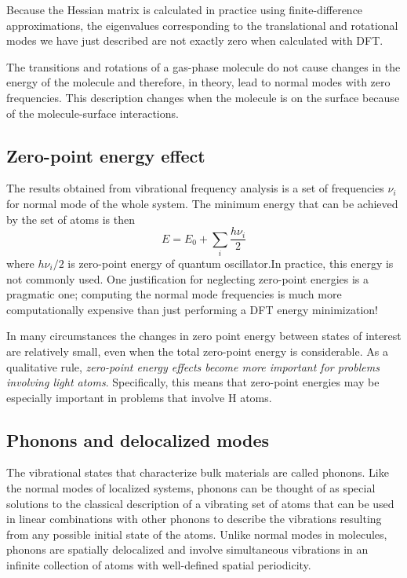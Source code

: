 \documentclass[12pt]{article}
\begin{document}
Because the Hessian matrix is calculated in practice using finite-difference approximations, the eigenvalues corresponding to the translational and rotational modes we have just described are not exactly zero when calculated with DFT.

The transitions and rotations of a gas-phase molecule do not cause changes in the energy of the molecule and therefore, in theory, lead to normal modes with zero frequencies. This description changes when the molecule is on the surface because of the molecule-surface interactions.

\subsection{Zero-point energy effect}
The results obtained from vibrational frequency analysis is a set of frequencies $\nu_i$ for normal mode of the whole system. The minimum energy that can be achieved by the set of atoms is then
\begin{equation}
    E = E_0 + \sum_i\frac{h\nu_i}{2}
\end{equation}
where $h\nu_i/2$ is zero-point energy of quantum oscillator.In practice, this energy is not commonly used. One justification for neglecting zero-point energies is a pragmatic one; computing the normal mode frequencies is much more computationally expensive than just performing a DFT energy minimization!

In many circumstances the changes in zero point energy between states of interest are relatively small, even when the total zero-point energy is considerable. As a qualitative rule, \emph{zero-point energy effects become more important for problems involving light atoms}. Specifically, this means that zero-point energies may be especially important in problems that involve H atoms.

\subsection{Phonons and delocalized modes}
The vibrational states that characterize bulk materials are called phonons. Like the normal modes of localized systems, phonons can be thought of as special solutions to the classical description of a vibrating set of atoms that can be used in linear combinations with other phonons to describe the vibrations resulting from any possible initial state of the atoms. Unlike normal modes in molecules, phonons are spatially delocalized and involve simultaneous vibrations in an infinite collection of atoms with well-defined spatial periodicity.
\end{document}
